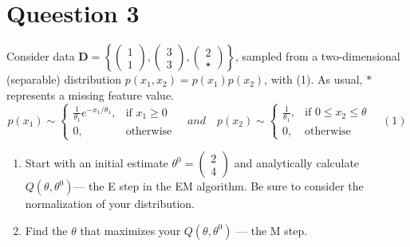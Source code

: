 \documentclass[a4paper,11pt,onecolumn,oneside,UTF8]{article}
\begin{document}
\section*{Queestion 3}
Consider data $\bm D =  \left \{ \begin{pmatrix} 1\\1 \end{pmatrix},\begin{pmatrix} 3\\3 \end{pmatrix},
    \begin{pmatrix} 2\\\star \end{pmatrix} \right \} $, sampled from a two-dimensional (separable) distribution
$p(x_1,x_2) = p(x_1)p(x_2)$, with (1). As usual, $\ast$ represents a missing feature value.
$$
    p \left(x_1\right) \sim
    \begin{cases}
        \frac{1}{\theta_1}e^{-x_1/\theta_1}, & \mbox{if }x_1\ge 0 \\
        0,                                   & \mbox{otherwise}
    \end{cases}
    \quad and\quad
    p \left(x_2\right) \sim
    \begin{cases}
        \frac{1}{\theta_1}, & \mbox{if }0\leq x_2\leq\theta \\
        0,                  & \mbox{otherwise}
    \end{cases}
    \quad \left(1\right)
$$
\begin{enumerate}
    \item Start with an initial estimate $\theta^0 = \begin{pmatrix} 2\\4 \end{pmatrix}$
          and analytically calculate $𝑄(\theta,\theta^0)$— the E step
          in the EM algorithm. Be sure to consider the normalization of your distribution.
    \item Find the $\theta$ that maximizes your $𝑄(\theta,\theta^0)$ — the M step.
\end{enumerate}
\end{document}
